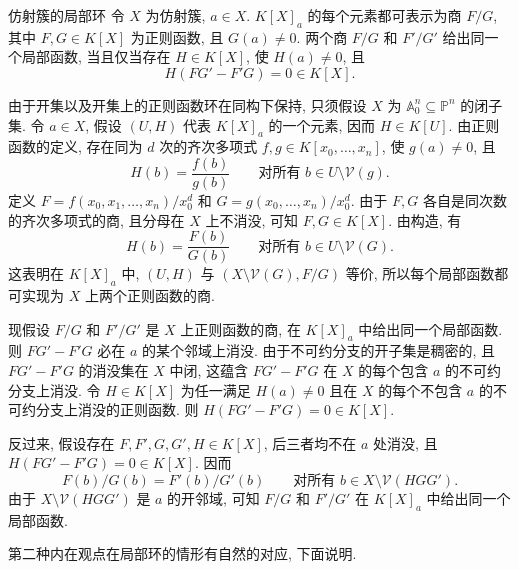 \begin{Lemma}{仿射簇的局部环}\leavevmode\label{lem:local-rings-of-affine-varieties-as-fractions}
令 $X$ 为仿射簇, $a\in X$. $K[X]_{a}$ 的每个元素都可表示为商 $F/G$, 其中 $F,G\in K[X]$ 为正则函数, 且 $G(a)\ne0$. 两个商 $F/G$ 和 $F'/G'$ 给出同一个局部函数, 当且仅当存在 $H\in K[X]$, 使 $H(a)\ne0$, 且
\[
  H(FG'-F'G)=0\in K[X].
\]
\end{Lemma}
\begin{Proof}
由于开集以及开集上的正则函数环在同构下保持, 只须假设 $X$ 为 $\mathbb{A}^{n}_{0}\subseteq\mathbb{P}^{n}$ 的闭子集. 令 $a\in X$, 假设 $(U,H)$ 代表 $K[X]_{a}$ 的一个元素, 因而 $H\in K[U]$. 由正则函数的定义, 存在同为 $d$ 次的齐次多项式 $f,g\in K[x_{0},\ldots,x_{n}]$, 使 $g(a)\ne0$, 且
\[
  H(b)=\frac{f(b)}{g(b)}\qquad\text{对所有 }b\in U\setminus\mathcal{V}(g).
\]
定义 $F=f(x_{0},x_{1},\ldots,x_{n})/x_{0}^{d}$ 和 $G=g(x_{0},\ldots,x_{n})/x_{0}^{d}$. 由于 $F,G$ 各自是同次数的齐次多项式的商, 且分母在 $X$ 上不消没, 可知 $F,G\in K[X]$. 由构造, 有
\[
  H(b)=\frac{F(b)}{G(b)}\qquad\text{对所有 }b\in U\setminus\mathcal{V}(G).
\]
这表明在 $K[X]_{a}$ 中, $(U,H)$ 与 $(X\setminus\mathcal{V}(G),F/G)$ 等价, 所以每个局部函数都可实现为 $X$ 上两个正则函数的商.

现假设 $F/G$ 和 $F'/G'$ 是 $X$ 上正则函数的商, 在 $K[X]_{a}$ 中给出同一个局部函数. 则 $FG'-F'G$ 必在 $a$ 的某个邻域上消没. 由于不可约分支的开子集是稠密的, 且 $FG'-F'G$ 的消没集在 $X$ 中闭, 这蕴含 $FG'-F'G$ 在 $X$ 的每个包含 $a$ 的不可约分支上消没. 令 $H\in K[X]$ 为任一满足 $H(a)\ne0$ 且在 $X$ 的每个不包含 $a$ 的不可约分支上消没的正则函数. 则 $H(FG'-F'G)=0\in K[X]$.

反过来, 假设存在 $F,F',G,G',H\in K[X]$, 后三者均不在 $a$ 处消没, 且 $H(FG'-F'G)=0\in K[X]$. 因而
\[
  F(b)/G(b)=F'(b)/G'(b)\qquad\text{对所有 }b\in X\setminus\mathcal{V}(HGG').
\]
由于 $X\setminus\mathcal{V}(HGG')$ 是 $a$ 的开邻域, 可知 $F/G$ 和 $F'/G'$ 在 $K[X]_{a}$ 中给出同一个局部函数.
\end{Proof}

第二种内在观点在局部环的情形有自然的对应, 下面说明.

